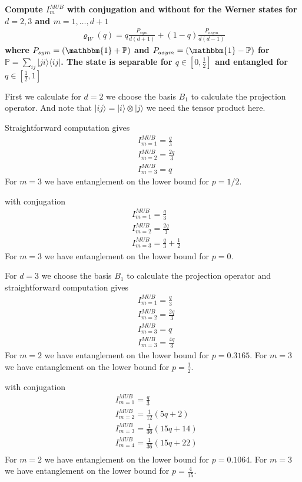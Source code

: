 \documentclass[a4paper]{article}
\newcounter{exercise}
\newenvironment{MyExercise}%
{\begin{mdframed}[style=exercisestyle]}{\end{mdframed}}
\begin{document}
\newpage
\begin{MyExercise}
    \textbf{
        Compute $I_m^{MUB}$ with conjugation and without for the Werner states
        for $d=2, 3$ and $m=1,\dots, d+1$
        \begin{align}
            \varrho_W(q) = q \frac{P_{sym}}{d(d+1)} + (1-q) \frac{P_{asym}}{d(d-1)}
        \end{align}
        where $P_{sym} = (\mathbbm{1} + \mathbb{P})$ and $P_{asym} =
        (\mathbbm{1} - \mathbb{P})$  for $\mathbb{P} = \sum_{ij}
        |ji\rangle\langle ij|$. The state is separable for $q\in [0,\frac{1}{2}]$ and
        entangled for $q\in [\frac{1}{2}, 1]$
    }

    First we calculate for $d=2$ we choose the basis $B_1$ to calculate the projection
    operator. And note that $|ij\rangle = |i\rangle \otimes |j\rangle$ we need
    the tensor product here.

    Straightforward computation gives
    \begin{align}
        &I^{MUB}_{m=1} = \frac{q}{3}\\
        &I^{MUB}_{m=2} = \frac{2q}{3}\\
        &I^{MUB}_{m=3} =    q
    \end{align}
    For $m=3$ we have entanglement on the lower bound for $p = 1/2$.

    with conjugation
    \begin{align}
        &I^{MUB}_{m=1} = \frac{q}{3}\\
        &I^{MUB}_{m=2} = \frac{2q}{3}\\
        &I^{MUB}_{m=3} = \frac{q}{3} + \frac{1}{2}
    \end{align}
    For $m=3$ we have entanglement on the lower bound for $p = 0$.

    For $d=3$ we choose the basis $B_1$ to calculate the projection operator
    and straightforward computation gives
    \begin{align}
        &I^{MUB}_{m=1} = \frac{q}{3}\\
        &I^{MUB}_{m=2} = \frac{2q}{3}\\
        &I^{MUB}_{m=3} = q \\
        &I^{MUB}_{m=3} = \frac{4q}{3}
    \end{align}
    For $m=2$ we have entanglement on the lower bound for $p = 0.3165$.
    For $m=3$ we have entanglement on the lower bound for $p = \frac{1}{2}$.

    with conjugation
    \begin{align}
        &I^{MUB}_{m=1} = \frac{q}{3}\\
        &I^{MUB}_{m=2} = \frac{1}{12}(5q + 2)\\
        &I^{MUB}_{m=3} = \frac{1}{36}(15q + 14)\\
        &I^{MUB}_{m=4} = \frac{1}{36}(15q + 22)\\
    \end{align}
    For $m=2$ we have entanglement on the lower bound for $p = 0.1064$.
    For $m=3$ we have entanglement on the lower bound for $p = \frac{4}{15}$.


\end{MyExercise}
\end{document}
